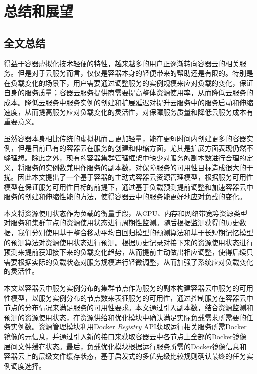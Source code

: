 \chapter{总结和展望}\label{chap:summary}
\section{全文总结}
得益于容器虚拟化技术轻便的特性，越来越多的用户正逐渐转向容器云的相关服务。但是对于云服务而言，仅仅是容器本身的轻便带来的帮助还是有限的。特别是在负载变化的场景下，用户需要通过调整服务的实例规模来应对负载的变化，保证自身的服务质量；容器云服务提供商需要提高整体资源使用率，从而降低云服务的成本。降低云服务中服务实例的创建和扩展延迟对提升云服务中的服务启动和伸缩速度，从而提高服务应对负载变化的灵活性，对保障服务质量和降低云服务成本有重要意义。

虽然容器本身相比传统的虚拟机而言更加轻量，能在更短时间内创建更多的容器实例，但是目前已有的容器云在服务的创建和伸缩方面，尤其是扩展方面表现仍然不够理想。除此之外，现有的容器集群管理框架中缺少对服务的副本数进行合理的定义，将服务的实例数兼用作服务的副本数，对保障服务的可用性目标造成很大的干扰。因此本文提出了一个基于容器的主动式容器云资源管理模型，根据服务可用性模型在保证服务可用性目标的前提下，通过基于负载预测提前调整和加速容器云中服务的创建和伸缩性能的方法，使得容器云中的服务能更好地应对负载的变化。

本文将资源使用状态作为负载的衡量手段，从CPU、内存和网络带宽等资源类型对服务和集群节点的资源使用状态进行周期性监测。随后根据监测获得的历史数据，我们分别使用基于整合移动平均自回归模型的预测算法和基于长短期记忆模型的预测算法对资源使用状态进行预测。根据历史记录对接下来的资源使用状态进行预测来提前获知接下来的负载变化趋势，从而提前主动做出相应调整，使得后续只需要根据实际的负载状态对服务规模进行轻微调整，从而加强了系统应对负载变化的灵活性。

本文以容器云中服务实例分布的集群节点作为服务的副本构建容器云中服务的可用性模型，以服务实例分布的节点数来表征服务的可用性，通过控制服务在容器云中节点的分布情况来满足服务的可用性要求。本文通过引入副本数，结合资源监测和预测的资源使用状态，在资源供给和优化模块中确认满足实际负载需求所需要的任务实例数。资源管理模块利用Docker \emph{Registry} API获取运行相关服务所需Docker镜像的元信息，并通过引入新的接口来获取容器云中各节点上全部的Docker镜像层间文件缓存状态。最后，负载优化模块根据运行服务所需的Docker镜像信息和容器云上的层级文件缓存状态，基于启发式的多优先级比较规则确认最终的任务实例调度选择。

